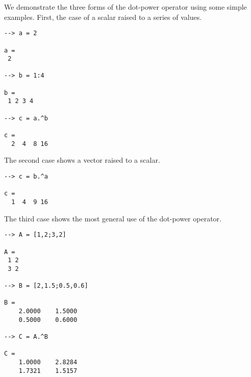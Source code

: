 We demonstrate the three forms of the dot-power operator using some simple examples.  First, the case of a scalar raised to a series of values.
\begin{verbatim}
--> a = 2

a = 
 2 

--> b = 1:4

b = 
 1 2 3 4 

--> c = a.^b

c = 
  2  4  8 16 
\end{verbatim}
The second case shows a vector raised to a scalar.
\begin{verbatim}
--> c = b.^a

c = 
  1  4  9 16 
\end{verbatim}
The third case shows the most general use of the dot-power operator.
\begin{verbatim}
--> A = [1,2;3,2]

A = 
 1 2 
 3 2 

--> B = [2,1.5;0.5,0.6]

B = 
    2.0000    1.5000 
    0.5000    0.6000 

--> C = A.^B

C = 
    1.0000    2.8284 
    1.7321    1.5157 
\end{verbatim}
